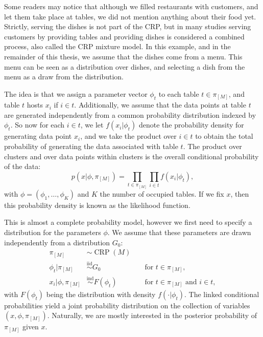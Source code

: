 Some readers may notice that although we filled restaurants with customers, and let them take place at tables, we did not mention anything about their food yet. Strictly, serving the dishes is not part of the CRP, but in many studies serving customers by providing tables and providing dishes is considered a combined process, also called the CRP mixture model. In this example, and in the remainder of this thesis, we assume that the dishes come from a menu. This menu can be seen as a distribution over dishes, and selecting a dish from the menu as a draw from the distribution.

The idea is that we assign a parameter vector $\phi_t$ to each table $t\in\pi_{[M]}$, and table $t$ hosts $x_i$ if $i\in t$. Additionally, we assume that the data points at table $t$ are generated independently from a common probability distribution indexed by $\phi_t$. So now for each $i\in t$, we let $f(x_i|\phi_t)$ denote the probability density for generating data point $x_i$, and we take the product over $i\in t$ to obtain the total probability of generating the data associated with table $t$. The product over clusters and over data points within clusters is the overall conditional probability of the data:
\begin{equation}
	p(x|\phi,\pi_{[M]}) = \prod_{t\in\pi_{[M]}}\prod_{i\in t} f(x_i|\phi_t),
\end{equation}
with $\phi=(\phi_1,\ldots,\phi_K)$ and $K$ the number of occupied tables. If we fix $x$, then this probability density is known as the likelihood function.

This is almost a complete probability model, however we first need to specify a distribution for the parameters $\phi$. We assume that these parameters are drawn independently from a distribution $G_0$:
\begin{align}
	\pi_{[M]} &\sim \operatorname{CRP}(M)\label{eq:CRPMMpartition} \\
    \phi_t | \pi_{[M]} &\overset{\text{iid}}{\sim} G_0 && \text{ for }t\in\pi_{[M]},\label{eq:CRPMMlatent} \\
    x_i|\phi,\pi_{[M]} &\overset{\text{ind}}{\sim} F(\phi_t) && \text{ for }t\in\pi_{[M]}\text{ and }i\in t,\label{eq:CRPMMdatapoints}
\end{align}
with $F(\phi_t)$ being the distribution with density $f(\cdot|\phi_t)$. The linked conditional probabilities yield a joint probability distribution on the collection of variables $(x,\phi,\pi_{[M]})$. Naturally, we are mostly interested in the posterior probability of $\pi_{[M]}$ given $x$.

